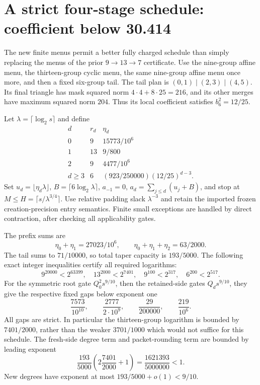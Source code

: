 \section{A strict four-stage schedule: coefficient below 30.414}
The new finite menus permit a better fully charged schedule than simply
replacing the menus of the prior $9\to13\to7$ certificate.
Use the nine-group affine menu, the thirteen-group cyclic menu, the same
nine-group affine menu once more, and then a fixed six-group tail.
The tail plan is $(0,1)\mid(2,3)\mid(4,5)$. Its final triangle has mask
squared norm $4\cdot4+8\cdot25=216$, and its other merges have maximum
squared norm $204$. Thus its local coefficient satisfies $b_6^2=12/25$.

Let $\lambda=\lceil\log_2s\rceil$ and define
\[
\begin{array}{c|c|c}
 d&r_d&\eta_d\\\hline
0&9&15773/10^6\\
1&13&9/800\\
2&9&4477/10^6\\
d\ge3&6&(923/250000)(12/25)^{d-3}.
\end{array}
\]
Set $u_d=\lfloor\eta_d\lambda\rfloor$,
$B=\lceil6\log_2\lambda\rceil$, $a_{-1}=0$, $a_d=\sum_{j\le d}(u_j+B)$,
and stop at $M\le H=\lceil s/\lambda^{3/4}\rceil$.
Use relative padding slack $\lambda^{-3}$ and retain the imported frozen
creation-precision entry semantics. Finite small exceptions are handled
by direct contraction, after checking all applicability gates.

The prefix sums are
\[
 \eta_0+\eta_1=27023/10^6,\qquad
 \eta_0+\eta_1+\eta_2=63/2000.
\]
The tail sums to $71/10000$, so total taper capacity is $193/5000$.
The following exact integer inequalities certify all required logarithms:
\[
 9^{20000}<2^{63399},\quad
 13^{2000}<2^{7401},\quad
 9^{100}<2^{317},\quad
 6^{200}<2^{517}.
\]
For the symmetric root gate $Q_0^2s^{9/10}$, then the retained-side gates
$Q_ds^{9/10}$, they give the respective fixed gaps below exponent one
\[
 \frac{7573}{10^{10}},\qquad
 \frac{2777}{2\cdot10^9},\qquad
 \frac{29}{200000},\qquad
 \frac{219}{10^6}.
\]
All gaps are strict. In particular the thirteen-group logarithm is bounded
by $7401/2000$, rather than the weaker $3701/1000$ which would not suffice
for this schedule. The fresh-side degree term and packet-rounding term are
bounded by leading exponent
\[
 \frac{193}{5000}\left(2\frac{7401}{2000}+1\right)
 =\frac{1621393}{5000000}<1.
\]
New degrees have exponent at most $193/5000+o(1)<9/10$.

